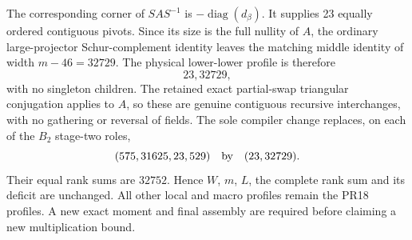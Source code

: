The corresponding corner of $SAS^{-1}$ is $-\operatorname{diag}(d_\beta)$.
It supplies 23 equally ordered contiguous pivots.  Since its size is
the full nullity of $A$, the ordinary large-projector Schur-complement
identity leaves the matching middle identity of width $m-46=32729$.
The physical lower-lower profile is therefore
\[
 \boxed{23,32729},
\]
with no singleton children.  The retained exact partial-swap triangular
conjugation applies to $A$, so these are genuine contiguous recursive
interchanges, with no gathering or reversal of fields.  The sole
compiler change replaces, on each of the $B_2$ stage-two roles,
\[
 (575,31625,23,529)\quad\hbox{by}\quad(23,32729).
\]
Their equal rank sums are $32752$.  Hence $W$, $m$, $L$, the complete
rank sum and its deficit are unchanged.  All other local and macro
profiles remain the PR18 profiles.  A new exact moment and final
assembly are required before claiming a new multiplication bound.
